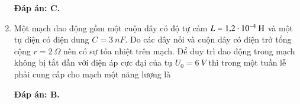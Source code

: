 \begin{enumerate}[label=\bfseries Câu \arabic*:]
{		
	}
	
	\hideall
	{		\textbf{Đáp án: C.}
		
		
		
	}
	\item {}
	
	{
		Một mạch dao động gồm một cuộn dây có độ tự cảm $L = \text{1,2} \cdot 10^{-4}\ \text H$ và một tụ điện có điện dung $C = \SI{3}{nF}$. Do các dây nối và cuộn dây có điện trở tổng cộng $r = \SI{2}{\Omega}$ nên có sự tỏa nhiệt trên mạch. Để duy trì dao động trong mạch không bị tắt dần với điện áp cực đại của tụ $U_0 =\SI{6}{V}$ thì trong một tuần lễ phải cung cấp cho mạch một năng lượng là
		
		
	}
	
	\hideall
	{		\textbf{Đáp án: B.}
		
		
		
	}
\end{enumerate}
